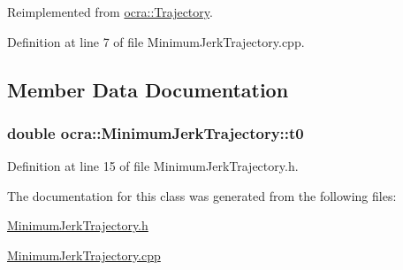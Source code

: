 Reimplemented from \hyperlink{classocra_1_1Trajectory_a2102a829e6dad497f7c773c346d499b7}{ocra\+::\+Trajectory}.



Definition at line 7 of file Minimum\+Jerk\+Trajectory.\+cpp.



\subsection{Member Data Documentation}
\subsubsection[{\texorpdfstring{t0}{t0}}]{\setlength{\rightskip}{0pt plus 5cm}double ocra\+::\+Minimum\+Jerk\+Trajectory\+::t0\hspace{0.3cm}{\ttfamily [protected]}}\hypertarget{classocra_1_1MinimumJerkTrajectory_a59c485dca4c2f2ed0c95809561dfff46}{}\label{classocra_1_1MinimumJerkTrajectory_a59c485dca4c2f2ed0c95809561dfff46}


Definition at line 15 of file Minimum\+Jerk\+Trajectory.\+h.



The documentation for this class was generated from the following files\+:\begin{DoxyCompactItemize}
\item 
\hyperlink{MinimumJerkTrajectory_8h}{Minimum\+Jerk\+Trajectory.\+h}\item 
\hyperlink{MinimumJerkTrajectory_8cpp}{Minimum\+Jerk\+Trajectory.\+cpp}\end{DoxyCompactItemize}

